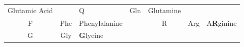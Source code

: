 \documentclass[12pt,a4paper,twoside]{book}
\theoremstyle{definition}
\theoremstyle{definition}
\theoremstyle{remark}
\begin{document}
\begin{longtable}[]{@{}ccllccl@{}}
\begin{minipage}[t]{0.13\columnwidth}
Glutamic Acid\strut
\end{minipage} & \begin{minipage}[t]{0.02\columnwidth}\raggedright\strut
\strut
\end{minipage} & \begin{minipage}[t]{0.13\columnwidth}\centering\strut
Q\strut
\end{minipage} & \begin{minipage}[t]{0.13\columnwidth}\centering\strut
Gln\strut
\end{minipage} & \begin{minipage}[t]{0.12\columnwidth}\raggedright\strut
Glutamine\strut
\end{minipage}\tabularnewline
\begin{minipage}[t]{0.14\columnwidth}\centering\strut
F\strut
\end{minipage} & \begin{minipage}[t]{0.13\columnwidth}\centering\strut
Phe\strut
\end{minipage} & \begin{minipage}[t]{0.13\columnwidth}\raggedright\strut
Phenylalanine\strut
\end{minipage} & \begin{minipage}[t]{0.02\columnwidth}\raggedright\strut
\strut
\end{minipage} & \begin{minipage}[t]{0.13\columnwidth}\centering\strut
R\strut
\end{minipage} & \begin{minipage}[t]{0.13\columnwidth}\centering\strut
Arg\strut
\end{minipage} & \begin{minipage}[t]{0.12\columnwidth}\raggedright\strut
A\textbf{R}ginine\strut
\end{minipage}\tabularnewline
\begin{minipage}[t]{0.14\columnwidth}\centering\strut
G\strut
\end{minipage} & \begin{minipage}[t]{0.13\columnwidth}\centering\strut
Gly\strut
\end{minipage} & \begin{minipage}[t]{0.13\columnwidth}\raggedright\strut
\textbf{G}lycine\strut
\end{minipage} & \begin{minipage}[t]{0.02\columnwidth}\raggedright\strut
\strut
\end{minipage} & \begin{minipage}[t]{0.13\columnwidth}\centering\strut

\end{minipage}
\end{longtable}
\end{document}
